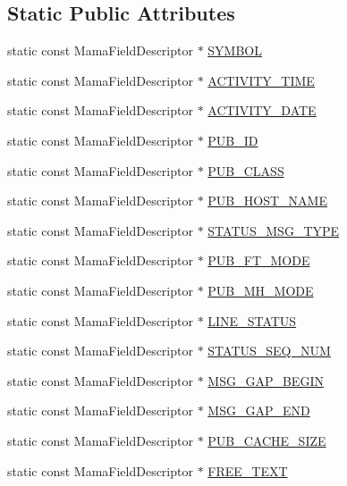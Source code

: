 \subsection*{Static Public Attributes}
\begin{CompactItemize}
\item 
static const Mama\-Field\-Descriptor $\ast$ \hyperlink{classWombat_1_1MamdaPubStatusFields_88e65570ddcee65400e471ed698b2e2b}{SYMBOL}
\item 
static const Mama\-Field\-Descriptor $\ast$ \hyperlink{classWombat_1_1MamdaPubStatusFields_523e4b2b57b4e6114514691addb1cd44}{ACTIVITY\_\-TIME}
\item 
static const Mama\-Field\-Descriptor $\ast$ \hyperlink{classWombat_1_1MamdaPubStatusFields_b0ec38f5625a6fa7f524a95dd196ba68}{ACTIVITY\_\-DATE}
\item 
static const Mama\-Field\-Descriptor $\ast$ \hyperlink{classWombat_1_1MamdaPubStatusFields_e52fe3a8969c9e638628515d00b0086c}{PUB\_\-ID}
\item 
static const Mama\-Field\-Descriptor $\ast$ \hyperlink{classWombat_1_1MamdaPubStatusFields_35ac49e98da0c6b83ff725b38f17b0f2}{PUB\_\-CLASS}
\item 
static const Mama\-Field\-Descriptor $\ast$ \hyperlink{classWombat_1_1MamdaPubStatusFields_8849bf7ea5194eab512bd72166a3aff1}{PUB\_\-HOST\_\-NAME}
\item 
static const Mama\-Field\-Descriptor $\ast$ \hyperlink{classWombat_1_1MamdaPubStatusFields_d36810587111dd66be2922fee75b4e10}{STATUS\_\-MSG\_\-TYPE}
\item 
static const Mama\-Field\-Descriptor $\ast$ \hyperlink{classWombat_1_1MamdaPubStatusFields_4886160ffa63ad3ee1cedc0acc689e80}{PUB\_\-FT\_\-MODE}
\item 
static const Mama\-Field\-Descriptor $\ast$ \hyperlink{classWombat_1_1MamdaPubStatusFields_64ffb8eead6d6d798f2f8fee68ab7a46}{PUB\_\-MH\_\-MODE}
\item 
static const Mama\-Field\-Descriptor $\ast$ \hyperlink{classWombat_1_1MamdaPubStatusFields_e35c058a3ee6910b1a46e4e3e048be5c}{LINE\_\-STATUS}
\item 
static const Mama\-Field\-Descriptor $\ast$ \hyperlink{classWombat_1_1MamdaPubStatusFields_3c61990455d83f906139e8bf8ed1c98a}{STATUS\_\-SEQ\_\-NUM}
\item 
static const Mama\-Field\-Descriptor $\ast$ \hyperlink{classWombat_1_1MamdaPubStatusFields_ff6c530d08edae1e52b805fbcfd13af8}{MSG\_\-GAP\_\-BEGIN}
\item 
static const Mama\-Field\-Descriptor $\ast$ \hyperlink{classWombat_1_1MamdaPubStatusFields_5ea3d0b466637cfa9786de7d3960e1c7}{MSG\_\-GAP\_\-END}
\item 
static const Mama\-Field\-Descriptor $\ast$ \hyperlink{classWombat_1_1MamdaPubStatusFields_bf1b32d3ca9d75d64c5fcae79a260738}{PUB\_\-CACHE\_\-SIZE}
\item 
static const Mama\-Field\-Descriptor $\ast$ \hyperlink{classWombat_1_1MamdaPubStatusFields_380597176b7af36daa069d3254022edd}{FREE\_\-TEXT}
\end{CompactItemize}


